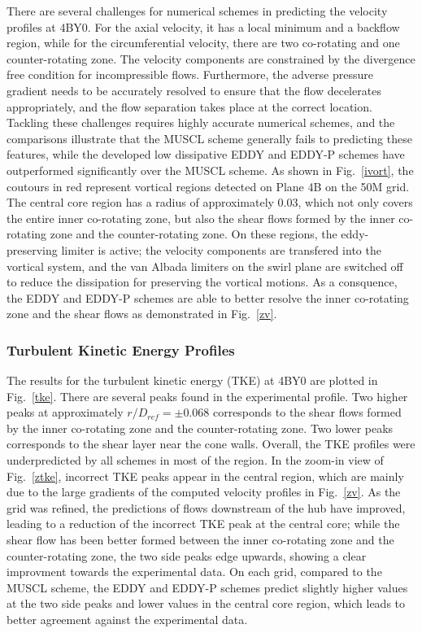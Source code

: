There are several challenges for numerical schemes in predicting the velocity profiles at 4BY0. For the axial velocity, it has a local minimum and a backflow region, while for the circumferential velocity, there are two co-rotating and one counter-rotating zone. The velocity components are constrained by the divergence free condition for incompressible flows. Furthermore, the adverse pressure gradient needs to be accurately resolved to ensure that the flow decelerates appropriately, and the flow separation takes place at the correct location. Tackling these challenges requires highly accurate numerical schemes, and the comparisons illustrate that the MUSCL scheme generally fails to predicting these features, while the developed low dissipative EDDY and EDDY-P schemes have outperformed significantly over the MUSCL scheme. As shown in Fig.~\ref{ivort}, the coutours in red represent vortical regions detected on Plane 4B on the 50M grid. The central core region has a radius of approximately 0.03, which not only covers the entire inner co-rotating zone, but also the shear flows formed by the inner co-rotating zone and the counter-rotating zone. On these regions, the eddy-preserving limiter is active; the velocity components are transfered into the vortical system, and the van Albada limiters on the swirl plane are switched off to reduce the dissipation for preserving the vortical motions. As a consquence, the EDDY and EDDY-P schemes are able to better resolve the inner co-rotating zone and the shear flows as demonstrated in Fig.~\ref{zv}.
\subsubsection{Turbulent Kinetic Energy Profiles}
The results for the turbulent kinetic energy (TKE)  at 4BY0 are plotted in Fig.~\ref{tke}. There are several peaks found in the experimental profile. Two higher peaks at approximately $r/D_{ref}=\pm 0.068$ corresponds to the shear flows formed by the inner co-rotating zone and the counter-rotating zone. Two lower peaks corresponds to the shear layer near the cone walls. Overall, the TKE profiles were underpredicted by all schemes in most of the region. In the zoom-in view of Fig.~\ref{ztke}, incorrect TKE peaks appear in the central region, which are mainly due to the large gradients of the computed velocity profiles in Fig.~\ref{zv}. As the grid was refined, the predictions of flows downstream of the hub have improved, leading to a reduction of the incorrect TKE peak at the central core; while the shear flow has been better formed between the inner co-rotating zone and the counter-rotating zone, the two side peaks edge upwards, showing a clear improvment towards the experimental data. On each grid, compared to the MUSCL scheme, the EDDY and EDDY-P schemes predict slightly higher values at the two side peaks and lower values in the central core region, which leads to better agreement against the experimental data. 
